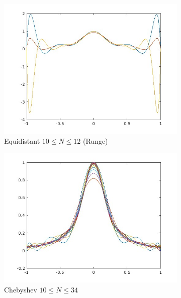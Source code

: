 \documentclass{article}
\begin{document}
\begin{figure}[H]
    \centering
    \begin{subfigure}[b]{0.3\linewidth}
	\includegraphics[width=\linewidth]{f1_equi_runge.jpg}
        \caption{Equidistant $10 \le N \le 12$ (Runge)}
    \end{subfigure}
    \begin{subfigure}[b]{0.3\linewidth}
	\includegraphics[width=\linewidth]{f1_cheb.jpg}
        \caption{Chebyshev $10 \le N \le 34$}
    \end{subfigure}
    \begin{subfigure}[b]{0.3\linewidth}

\end{subfigure}
\end{figure}
\end{document}

